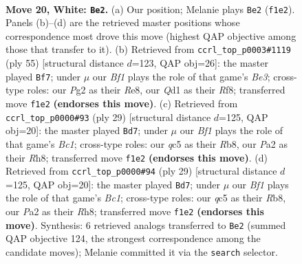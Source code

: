 \documentclass[11pt]{article}
\begin{document}
\clearpage

\begin{figure}[p]\centering
\begin{subfigure}{0.46\textwidth}\centering
\resizebox{\linewidth}{!}{%
\newchessgame
\chessboard[
  setfen={rn5r/3nk3/bp2p3/pNq1PpN1/2P2P1p/8/P2K2PP/R2Q1B1R w - - 1 20},
  showmover=false,
  pgfstyle=straightmove, color=movearrow, markmove={f1-e2}
]}
\caption{}
\end{subfigure}\hfill
\begin{subfigure}{0.46\textwidth}\centering
\resizebox{\linewidth}{!}{%
\newchessgame
\chessboard[
  setfen={4rr1k/1p4pp/2p1bq2/p2n1p1P/2p4R/P3P1P1/1P1QNPB1/4R1K1 b - - 4 28},
  showmover=false,
  pgfstyle=straightmove, color=movearrow, markmove={e6-f7}
]}
\caption{}
\end{subfigure}
\\[4pt]
\begin{subfigure}{0.46\textwidth}\centering
\resizebox{\linewidth}{!}{%
\newchessgame
\chessboard[
  setfen={1rbqk2r/5ppp/p1np4/3Np1b1/pN2P3/2P5/1P3PPP/R2QKB1R b KQk - 1 15},
  showmover=false,
  pgfstyle=straightmove, color=movearrow, markmove={c8-d7}
]}
\caption{}
\end{subfigure}\hfill
\begin{subfigure}{0.46\textwidth}\centering
\resizebox{\linewidth}{!}{%
\newchessgame
\chessboard[
  setfen={1rbqk2r/5ppp/p1np4/3Np1b1/pN2P3/2P5/1P3PPP/R2QKB1R b KQk - 1 15},
  showmover=false,
  pgfstyle=straightmove, color=movearrow, markmove={c8-d7}
]}
\caption{}
\end{subfigure}
\caption{\textbf{Move 20, White: \texttt{Be2}.} (a) Our position; Melanie plays \texttt{Be2} (\texttt{f1e2}). Panels (b)--(d) are the retrieved master positions whose correspondence most drove this move (highest QAP objective among those that transfer to it). (b) Retrieved from \texttt{ccrl\_top\_p0003\#1119} (ply 55) [structural distance $d$=123, QAP obj=26]: the master played \texttt{Bf7}; under $\mu$ our \emph{Bf1} plays the role of that game's \emph{Be3}; cross-type roles: our \emph{P}g2 as their \emph{R}e8, our \emph{Q}d1 as their \emph{R}f8; transferred move \texttt{f1e2} \textbf{(endorses this move)}. (c) Retrieved from \texttt{ccrl\_top\_p0000\#93} (ply 29) [structural distance $d$=125, QAP obj=20]: the master played \texttt{Bd7}; under $\mu$ our \emph{Bf1} plays the role of that game's \emph{Bc1}; cross-type roles: our \emph{q}c5 as their \emph{R}b8, our \emph{P}a2 as their \emph{R}h8; transferred move \texttt{f1e2} \textbf{(endorses this move)}. (d) Retrieved from \texttt{ccrl\_top\_p0000\#94} (ply 29) [structural distance $d$=125, QAP obj=20]: the master played \texttt{Bd7}; under $\mu$ our \emph{Bf1} plays the role of that game's \emph{Bc1}; cross-type roles: our \emph{q}c5 as their \emph{R}b8, our \emph{P}a2 as their \emph{R}h8; transferred move \texttt{f1e2} \textbf{(endorses this move)}. Synthesis: 6 retrieved analogs transferred to \texttt{Be2} (summed QAP objective 124, the strongest correspondence among the candidate moves); Melanie committed it via the \texttt{search} selector.}
\label{fig:thought-m38}
\end{figure}
\end{document}
